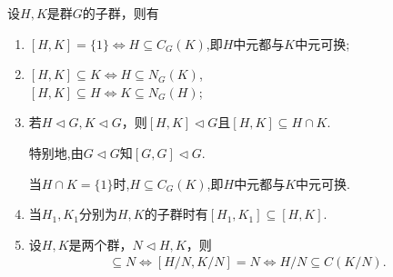 \documentclass[../../main.tex]{subfiles}%
\begin{document}
\begin{lemma}\label{lemma:换位子群的基本性质}
设$H, K$是群$G$的子群，则有
\begin{enumerate}[(1)]
\item\label{lemma:换位子群的基本性质-1} $[H, K] = \{1\}\iff H \subseteq C_G(K)$,即$H$中元都与$K$中元可换;

\item\label{lemma:换位子群的基本性质-2} $[H, K] \subseteq K\iff H \subseteq N_G(K)$,
\\
$[H, K] \subseteq H\iff K \subseteq N_G(H)$;

\item\label{lemma:换位子群的基本性质-3} 若$H \lhd G, K \lhd G$，则$[H, K] \lhd G$且$[H, K] \subseteq H \cap K$.

特别地,由$G\lhd G$知$[G,G]\lhd G$.

当$H\cap K=\{1\}$时,$H \subseteq C_G(K)$,即$H$中元都与$K$中元可换.

\item\label{lemma:换位子群的基本性质-4} 当$H_1, K_1$分别为$H, K$的子群时有$[H_1, K_1] \subseteq [H, K]$.

\item\label{lemma:换位子群的基本性质-5} 设$H,K$是两个群，$N\lhd H,K$，则
\begin{align*}
[H,K] \subseteq N \Longleftrightarrow [H/N,K/N] = N \Longleftrightarrow H/N \subseteq C(K/N).
\end{align*}
\end{enumerate}
\end{lemma}
\end{document}
